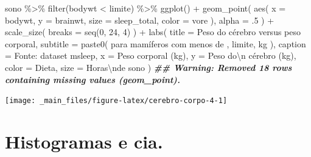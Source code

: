 \documentclass[
  11pt]{report}
\newenvironment{Shaded}{\begin{snugshade}}{\end{snugshade}}
\newcommand{\AttributeTok}[1]{\textcolor[rgb]{0.77,0.63,0.00}{#1}}
\newcommand{\DecValTok}[1]{\textcolor[rgb]{0.00,0.00,0.81}{#1}}
\newcommand{\DocumentationTok}[1]{\textcolor[rgb]{0.56,0.35,0.01}{\textbf{\textit{#1}}}}
\newcommand{\FunctionTok}[1]{\textcolor[rgb]{0.00,0.00,0.00}{#1}}
\newcommand{\NormalTok}[1]{#1}
\newcommand{\SpecialCharTok}[1]{\textcolor[rgb]{0.00,0.00,0.00}{#1}}
\newcommand{\StringTok}[1]{\textcolor[rgb]{0.31,0.60,0.02}{#1}}
\begin{document}
\begin{Shaded}
\begin{Highlighting}[]
\NormalTok{sono }\SpecialCharTok{\%\textgreater{}\%} 
  \FunctionTok{filter}\NormalTok{(bodywt }\SpecialCharTok{\textless{}}\NormalTok{ limite) }\SpecialCharTok{\%\textgreater{}\%} 
  \FunctionTok{ggplot}\NormalTok{() }\SpecialCharTok{+}
    \FunctionTok{geom\_point}\NormalTok{(}
      \FunctionTok{aes}\NormalTok{(}
        \AttributeTok{x =}\NormalTok{ bodywt, }
        \AttributeTok{y =}\NormalTok{ brainwt,}
        \AttributeTok{size =}\NormalTok{ sleep\_total,}
        \AttributeTok{color =}\NormalTok{ vore}
\NormalTok{      ), }
      \AttributeTok{alpha =}\NormalTok{ .}\DecValTok{5}
\NormalTok{    ) }\SpecialCharTok{+}
    \FunctionTok{scale\_size}\NormalTok{(}
      \AttributeTok{breaks =} \FunctionTok{seq}\NormalTok{(}\DecValTok{0}\NormalTok{, }\DecValTok{24}\NormalTok{, }\DecValTok{4}\NormalTok{)}
\NormalTok{    ) }\SpecialCharTok{+}
    \FunctionTok{labs}\NormalTok{(}
      \AttributeTok{title =} \StringTok{\textquotesingle{}Peso do cérebro versus peso corporal\textquotesingle{}}\NormalTok{,}
      \AttributeTok{subtitle =} \FunctionTok{paste0}\NormalTok{(}
        \StringTok{\textquotesingle{}para mamíferos com menos de \textquotesingle{}}\NormalTok{, }
\NormalTok{        limite, }
        \StringTok{\textquotesingle{} kg\textquotesingle{}}
\NormalTok{      ),}
      \AttributeTok{caption =} \StringTok{\textquotesingle{}Fonte: dataset \textasciigrave{}msleep\textasciigrave{}\textquotesingle{}}\NormalTok{,}
      \AttributeTok{x =} \StringTok{\textquotesingle{}Peso corporal (kg)\textquotesingle{}}\NormalTok{,}
      \AttributeTok{y =} \StringTok{\textquotesingle{}Peso do}\SpecialCharTok{\textbackslash{}n}\StringTok{ cérebro (kg)\textquotesingle{}}\NormalTok{,}
      \AttributeTok{color =} \StringTok{\textquotesingle{}Dieta\textquotesingle{}}\NormalTok{,}
      \AttributeTok{size =} \StringTok{\textquotesingle{}Horas}\SpecialCharTok{\textbackslash{}n}\StringTok{de sono\textquotesingle{}}
\NormalTok{    )}
\DocumentationTok{\#\# Warning: Removed 18 rows containing missing values (geom\_point).}
\end{Highlighting}
\end{Shaded}

\begin{center}\texttt{[image: \_main\_files/figure-latex/cerebro-corpo-4-1]} \end{center}

\hypertarget{histogramas-e-cia.}{%
\section{Histogramas e cia.}\label{histogramas-e-cia.}}
\end{document}
